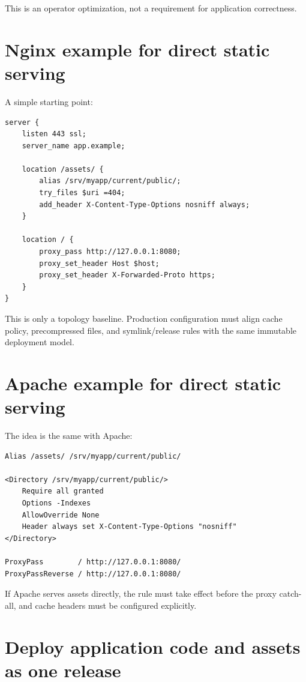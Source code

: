 This is an operator optimization, not a requirement for application correctness.

\section{Nginx example for direct static serving}

A simple starting point:

\begin{lstlisting}
server {
    listen 443 ssl;
    server_name app.example;

    location /assets/ {
        alias /srv/myapp/current/public/;
        try_files $uri =404;
        add_header X-Content-Type-Options nosniff always;
    }

    location / {
        proxy_pass http://127.0.0.1:8080;
        proxy_set_header Host $host;
        proxy_set_header X-Forwarded-Proto https;
    }
}
\end{lstlisting}

This is only a topology baseline. Production configuration must align cache policy, precompressed files, and symlink/release rules with the same immutable deployment model.

\section{Apache example for direct static serving}

The idea is the same with Apache:

\begin{lstlisting}
Alias /assets/ /srv/myapp/current/public/

<Directory /srv/myapp/current/public/>
    Require all granted
    Options -Indexes
    AllowOverride None
    Header always set X-Content-Type-Options "nosniff"
</Directory>

ProxyPass        / http://127.0.0.1:8080/
ProxyPassReverse / http://127.0.0.1:8080/
\end{lstlisting}

If Apache serves assets directly, the  rule must take effect before the proxy catch-all, and cache headers must be configured explicitly.

\section{Deploy application code and assets as one release}

